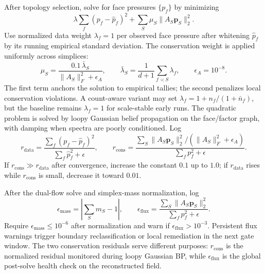 \documentclass[11pt]{article}
\begin{document}
After topology selection, solve for face pressures $\{p_f\}$ by minimizing
\[
\lambda\sum_f(p_f-\hat p_f)^2
+\sum_S\mu_S\|A_S\mathbf p_S\|_2^2.
\]
Use normalized data weight $\lambda_f=1$ per observed face pressure after whitening $\hat p_f$ by its running empirical standard deviation. The conservation weight is applied uniformly across simplices:
\[
\mu_S
=
\frac{0.1\,\bar\lambda_S}{\|A_S\|_F^2+\epsilon_A},
\qquad
\bar\lambda_S=\frac{1}{d+1}\sum_{f\prec S}\lambda_f,
\qquad
\epsilon_A=10^{-8}.
\label{eq:si-dual-flow-weight}
\]
The first term anchors the solution to empirical tallies; the second penalizes local conservation violations. A count-aware variant may set $\lambda_f=1+n_f/(1+\bar n_f)$, but the baseline remains $\lambda_f=1$ for scale-stable early runs. The quadratic problem is solved by loopy Gaussian belief propagation on the face/factor graph, with damping when spectra are poorly conditioned. Log
\[
r_{\mathrm{data}}
=
\frac{\sum_f(p_f-\hat p_f)^2}{\sum_f\hat p_f^2+\epsilon},
\qquad
r_{\mathrm{cons}}
=
\frac{
\sum_S\|A_S\mathbf p_S\|_2^2/(\|A_S\|_F^2+\epsilon_A)
}{
\sum_f p_f^2+\epsilon
}.
\label{eq:si-dual-flow-residuals}
\]
If $r_{\mathrm{cons}}\gg r_{\mathrm{data}}$ after convergence, increase the constant $0.1$ up to $1.0$; if $r_{\mathrm{data}}$ rises while $r_{\mathrm{cons}}$ is small, decrease it toward $0.01$.

After the dual-flow solve and simplex-mass normalization, log
\[
\epsilon_{\mathrm{mass}}
=
\left|\sum_S m_S-1\right|,
\qquad
\epsilon_{\mathrm{flux}}
=
\frac{\sum_S\|A_S\mathbf p_S\|_2^2}{\sum_f p_f^2+\epsilon}.
\]
Require $\epsilon_{\mathrm{mass}}\le10^{-6}$ after normalization and warn if $\epsilon_{\mathrm{flux}}>10^{-3}$. Persistent flux warnings trigger boundary reclassification or local remediation in the next gate window.
The two conservation residuals serve different purposes: $r_{\mathrm{cons}}$ is the normalized residual monitored during loopy Gaussian BP, while $\epsilon_{\mathrm{flux}}$ is the global post-solve health check on the reconstructed field.
\end{document}
